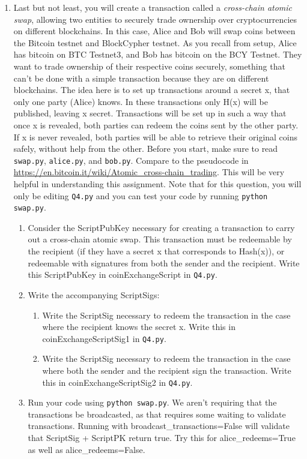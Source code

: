 \documentclass[11pt]{article}
\newenvironment{problems}
{\begin{enumerate}[label=\bfseries Exercise \arabic*.,align=left]}
{\end{enumerate}}
\begin{document}
\begin{problems}
\item Last but not least, you will create a transaction called a {\it cross-chain atomic swap}, allowing two entities to securely trade ownership over cryptocurrencies on different blockchains. In this case, Alice and Bob will swap coins between the Bitcoin testnet and BlockCypher testnet. As you recall from setup, Alice has bitcoin on BTC Testnet3, and Bob has bitcoin on the BCY Testnet. They want to trade ownership of their respective coins securely, something that can't be done with a simple transaction because they are on different blockchains. The idea here is to set up transactions around a secret x, that only one party (Alice) knows. In these transactions only H(x) will be published, leaving x secret. Transactions will be set up in such a way that once x is revealed, both parties can redeem the coins sent by the other party. If x is never revealed, both parties will be able to retrieve their original coins safely, without help from the other. Before you start, make sure to read \texttt{swap.py}, \texttt{alice.py}, and \texttt{bob.py}. Compare to the pseudocode in \href{https://en.bitcoin.it/wiki/Atomic\_cross-chain\_trading}{https://en.bitcoin.it/wiki/Atomic\_cross-chain\_trading}. This will be very helpful in understanding this assignment. Note that for this question, you will only be editing \texttt{Q4.py} and you can test your code by running \texttt{python swap.py}.

    \begin{enumerate}
    \item
    	Consider the ScriptPubKey necessary for creating a transaction to carry out a cross-chain atomic swap. This transaction must be redeemable by the recipient (if they have a secret x that corresponds to Hash(x)), or redeemable with signatures from both the sender and the recipient. Write this ScriptPubKey in coinExchangeScript in \texttt{Q4.py}.

    \item Write the accompanying ScriptSigs:
    	\begin{enumerate}
    	\item
    		Write the ScriptSig necessary to redeem the transaction in the case where the recipient knows the secret x. Write this in coinExchangeScriptSig1 in \texttt{Q4.py}.
    	\item
    		Write the ScriptSig necessary to redeem the transaction in the case where both the sender and the recipient sign the transaction. Write this in coinExchangeScriptSig2 in \texttt{Q4.py}.
    	\end{enumerate}
    \item
    	Run your code using \texttt{python swap.py}. We aren't requiring that the transactions be broadcasted, as that requires some waiting to validate transactions. Running with broadcast\_transactions=False will validate that ScriptSig + ScriptPK return true. Try this for alice\_redeems=True as well as alice\_redeems=False.


\end{enumerate}
\end{problems}
\end{document}
